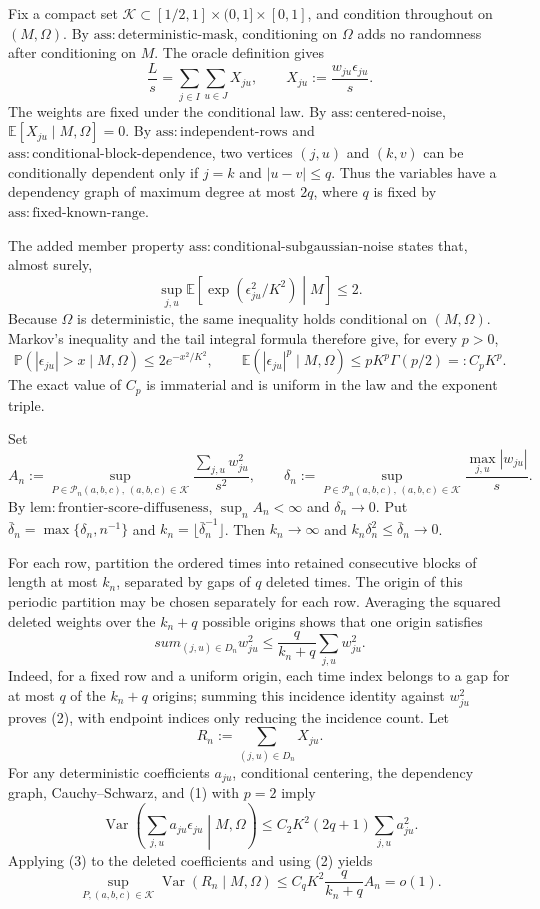 Fix a compact set \(\mathcal K\subset [1/2,1]\times(0,1]\times[0,1]\), and condition throughout on \((M,\Omega)\).  By \(\mathrm{ass:deterministic\mbox{-}mask}\), conditioning on \(\Omega\) adds no randomness after conditioning on \(M\).  The oracle definition gives
\[
 \frac{L}{s}=\sum_{j\in I}\sum_{u\in J}X_{ju},
 \qquad
 X_{ju}:=\frac{w_{ju}\epsilon_{ju}}{s}.
\]
The weights are fixed under the conditional law.  By \(\mathrm{ass:centered\mbox{-}noise}\), \(\mathbb E[X_{ju}\mid M,\Omega]=0\).  By \(\mathrm{ass:independent\mbox{-}rows}\) and \(\mathrm{ass:conditional\mbox{-}block\mbox{-}dependence}\), two vertices \((j,u)\) and \((k,v)\) can be conditionally dependent only if \(j=k\) and \(|u-v|\le q\).  Thus the variables have a dependency graph of maximum degree at most \(2q\), where \(q\) is fixed by \(\mathrm{ass:fixed\mbox{-}known\mbox{-}range}\).

The added member property \(\mathrm{ass:conditional\mbox{-}subgaussian\mbox{-}noise}\) states that, almost surely,
\[
 \sup_{j,u}\mathbb E\!\left[\exp\!\left(\epsilon_{ju}^{2}/K^{2}\right)\middle|M\right]\le 2.
\]
Because \(\Omega\) is deterministic, the same inequality holds conditional on \((M,\Omega)\).  Markov's inequality and the tail integral formula therefore give, for every \(p>0\),
\[
 \mathbb P(|\epsilon_{ju}|>x\mid M,\Omega)
 \le 2e^{-x^{2}/K^{2}},
 \qquad
 \mathbb E(|\epsilon_{ju}|^{p}\mid M,\Omega)
 \le pK^{p}\Gamma(p/2)=:C_pK^p.
\tag{1}
\]
The exact value of \(C_p\) is immaterial and is uniform in the law and the exponent triple.

Set
\[
 A_n:=\sup_{P\in\mathcal P_n(a,b,c),\,(a,b,c)\in\mathcal K}
       \frac{\sum_{j,u}w_{ju}^{2}}{s^{2}},
 \qquad
 \delta_n:=\sup_{P\in\mathcal P_n(a,b,c),\,(a,b,c)\in\mathcal K}
       \frac{\max_{j,u}|w_{ju}|}{s}.
\]
By \(\mathrm{lem:frontier\mbox{-}score\mbox{-}diffuseness}\), \(\sup_n A_n<\infty\) and \(\delta_n\to0\).  Put \(\bar\delta_n=\max\{\delta_n,n^{-1}\}\) and \(k_n=\lfloor\bar\delta_n^{-1}\rfloor\).  Then \(k_n\to\infty\) and \(k_n\delta_n^2\le\bar\delta_n\to0\).

For each row, partition the ordered times into retained consecutive blocks of length at most \(k_n\), separated by gaps of \(q\) deleted times.  The origin of this periodic partition may be chosen separately for each row.  Averaging the squared deleted weights over the \(k_n+q\) possible origins shows that one origin satisfies
\[
 sum_{(j,u)\in D_n}w_{ju}^{2}
 \le \frac{q}{k_n+q}\sum_{j,u}w_{ju}^{2}.
\tag{2}
\]
Indeed, for a fixed row and a uniform origin, each time index belongs to a gap for at most \(q\) of the \(k_n+q\) origins; summing this incidence identity against \(w_{ju}^{2}\) proves (2), with endpoint indices only reducing the incidence count.  Let
\[
 R_n:=\sum_{(j,u)\in D_n}X_{ju}.
\]
For any deterministic coefficients \(a_{ju}\), conditional centering, the dependency graph, Cauchy--Schwarz, and (1) with \(p=2\) imply
\[
 \operatorname{Var}\!\left(\sum_{j,u}a_{ju}\epsilon_{ju}\middle|M,\Omega\right)
 \le C_2K^2(2q+1)\sum_{j,u}a_{ju}^{2}.
\tag{3}
\]
Applying (3) to the deleted coefficients and using (2) yields
\[
 \sup_{P,(a,b,c)\in\mathcal K}
 \operatorname{Var}(R_n\mid M,\Omega)
 \le C_qK^2\frac{q}{k_n+q}A_n=o(1).
\tag{4}
\]

